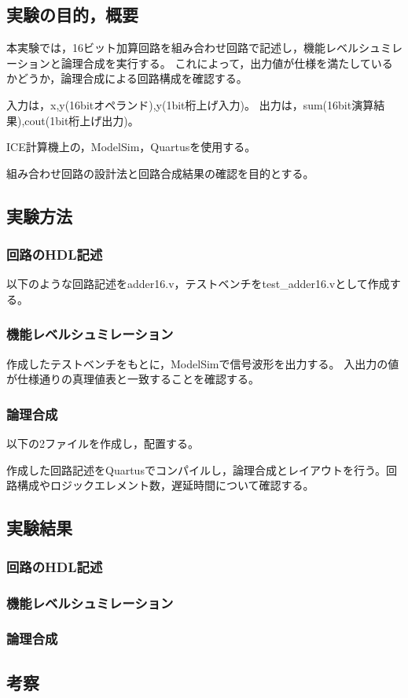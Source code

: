 
\subsection{実験の目的，概要}
本実験では，16ビット加算回路を組み合わせ回路で記述し，機能レベルシュミレーションと論理合成を実行する。
これによって，出力値が仕様を満たしているかどうか，論理合成による回路構成を確認する。

入力は，x,y(16bitオペランド),y(1bit桁上げ入力)。
出力は，sum(16bit演算結果),cout(1bit桁上げ出力)。

ICE計算機上の，ModelSim，Quartusを使用する。

組み合わせ回路の設計法と回路合成結果の確認を目的とする。

\subsection{実験方法}
\subsubsection{回路のHDL記述}
以下のような回路記述をadder16.v，テストベンチをtest\_adder16.vとして作成する。



\subsubsection{機能レベルシュミレーション}
作成したテストベンチをもとに，ModelSimで信号波形を出力する。
入出力の値が仕様通りの真理値表と一致することを確認する。

\subsubsection{論理合成}
以下の2ファイルを作成し，配置する。



作成した回路記述をQuartusでコンパイルし，論理合成とレイアウトを行う。回路構成やロジックエレメント数，遅延時間について確認する。
 
\subsection{実験結果}
\subsubsection{回路のHDL記述}
\subsubsection{機能レベルシュミレーション}
\subsubsection{論理合成}
\subsection{考察}
